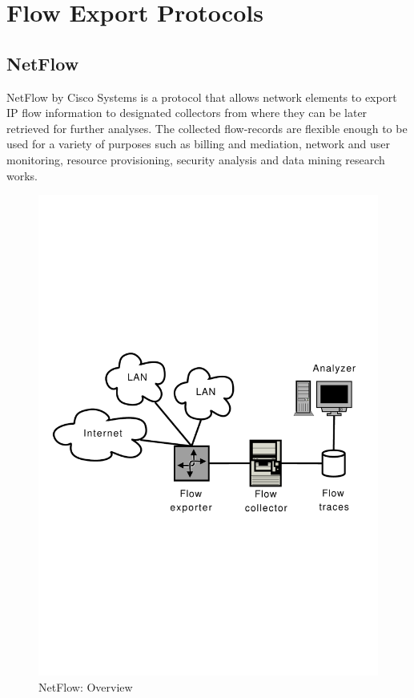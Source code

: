 \chapter{Flow Export Protocols}\label{ch:flow-export-protocols}

\section{NetFlow}\label{sec:netflow}
NetFlow \cite{rfc3954} by Cisco Systems is a protocol that allows network elements to export \ac{IP} flow information to designated collectors from where they can be later retrieved for further analyses. The collected flow-records are flexible enough to be used for a variety of purposes such as billing and mediation, network and user monitoring, resource provisioning, security analysis and data mining research works.  

\begin{figure}[h!]
\begin{center}
  \includegraphics* [width=0.7\linewidth]{figures/netflow-overview}	
  \caption{NetFlow: Overview \cite{nmelnikov:thesis:2010}}
  \label{fig:netflow-overview}
\end{center}
\end{figure}

